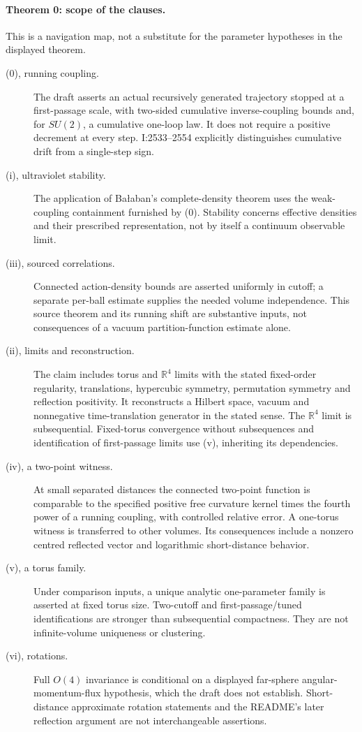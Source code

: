 \documentclass[11pt]{article}
\theoremstyle{remark}
\begin{document}
\paragraph{Theorem 0: scope of the clauses.}
This is a navigation map, not a substitute for the
parameter hypotheses in the displayed theorem.
\begin{description}
\item[(0), running coupling.]
The draft asserts an actual recursively generated trajectory
stopped at a first-passage scale, with two-sided cumulative
inverse-coupling bounds and, for \(SU(2)\), a cumulative
one-loop law. It does not require a positive decrement at
every step. I:2533--2554 explicitly distinguishes cumulative
drift from a single-step sign.
\item[(i), ultraviolet stability.]
The application of Ba{\l}aban's complete-density theorem
uses the weak-coupling containment furnished by (0).
Stability concerns effective densities and their prescribed
representation, not by itself a continuum observable limit.
\item[(iii), sourced correlations.]
Connected action-density bounds are asserted uniformly in
cutoff; a separate per-ball estimate supplies the needed
volume independence. This source theorem and its running
shift are substantive inputs, not consequences of a vacuum
partition-function estimate alone.
\item[(ii), limits and reconstruction.]
The claim includes torus and \(\mathbb R^4\) limits with
the stated fixed-order regularity, translations, hypercubic
symmetry, permutation symmetry and reflection positivity.
It reconstructs a Hilbert space, vacuum and nonnegative
time-translation generator in the stated sense.
The \(\mathbb R^4\) limit is subsequential. Fixed-torus
convergence without subsequences and identification of
first-passage limits use (v), inheriting its dependencies.
\item[(iv), a two-point witness.]
At small separated distances the connected two-point
function is comparable to the specified positive free
curvature kernel times the fourth power of a running
coupling, with controlled relative error. A one-torus
witness is transferred to other volumes. Its consequences
include a nonzero centred reflected vector and logarithmic
short-distance behavior.
\item[(v), a torus family.]
Under comparison inputs, a unique analytic one-parameter
family is asserted at fixed torus size. Two-cutoff and
first-passage/tuned identifications are stronger than
subsequential compactness. They are not infinite-volume
uniqueness or clustering.
\item[(vi), rotations.]
Full \(O(4)\) invariance is conditional on a displayed
far-sphere angular-momentum-flux hypothesis, which the
draft does not establish. Short-distance approximate
rotation statements and the README's later reflection
argument are not interchangeable assertions.
\end{description}
\end{document}
